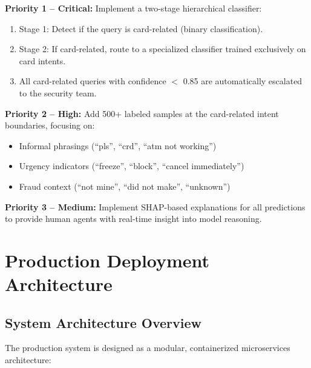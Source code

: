 \documentclass[12pt,a4paper]{article}
\begin{document}
\begin{insightbox}
\textbf{Priority 1 -- Critical:} Implement a two-stage hierarchical classifier:
\begin{enumerate}[leftmargin=*]
    \item Stage 1: Detect if the query is card-related (binary classification).
    \item Stage 2: If card-related, route to a specialized classifier trained exclusively on card intents.
    \item All card-related queries with confidence $<$ 0.85 are automatically escalated to the security team.
\end{enumerate}

\textbf{Priority 2 -- High:} Add 500+ labeled samples at the card-related intent boundaries, focusing on:
\begin{itemize}[leftmargin=*]
    \item Informal phrasings (``pls'', ``crd'', ``atm not working'')
    \item Urgency indicators (``freeze'', ``block'', ``cancel immediately'')
    \item Fraud context (``not mine'', ``did not make'', ``unknown'')
\end{itemize}

\textbf{Priority 3 -- Medium:} Implement SHAP-based explanations for all predictions to provide human agents with real-time insight into model reasoning.
\end{insightbox}

\newpage
\section{Production Deployment Architecture}
\label{sec:deployment}

\subsection{System Architecture Overview}
\label{subsec:system-arch}

The production system is designed as a modular, containerized microservices architecture:
\end{document}

